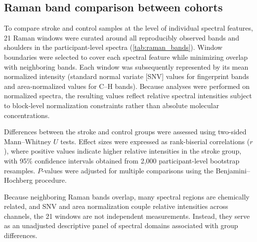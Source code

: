 \documentclass[preprint,12pt]{elsarticle}
\begin{document}
\subsection{Raman band comparison between cohorts} 
\label{subsec:band_analysis}

To compare stroke and control samples at the level of individual spectral features, 21 Raman windows were curated around all reproducibly observed bands and shoulders in the participant-level spectra (\cref{tab:raman_bands}). Window boundaries were selected to cover each spectral feature while minimizing overlap with neighboring bands. Each window was subsequently represented by its mean normalized intensity (standard normal variate [SNV] values for fingerprint bands and area-normalized values for C--H bands). Because analyses were performed on normalized spectra, the resulting values reflect relative spectral intensities subject to block-level normalization constraints rather than absolute molecular concentrations.

Differences between the stroke and control groups were assessed using two-sided Mann--Whitney $U$ tests. Effect sizes were expressed as rank-biserial correlations ($r$), where positive values indicate higher relative intensities in the stroke group, with 95\% confidence intervals obtained from 2,000 participant-level bootstrap resamples. $P$-values were adjusted for multiple comparisons using the Benjamini--Hochberg procedure.

Because neighboring Raman bands overlap, many spectral regions are chemically related, and SNV and area normalization couple relative intensities across channels, the 21 windows are not independent measurements. Instead, they serve as an unadjusted descriptive panel of spectral domains associated with group differences.
\end{document}
